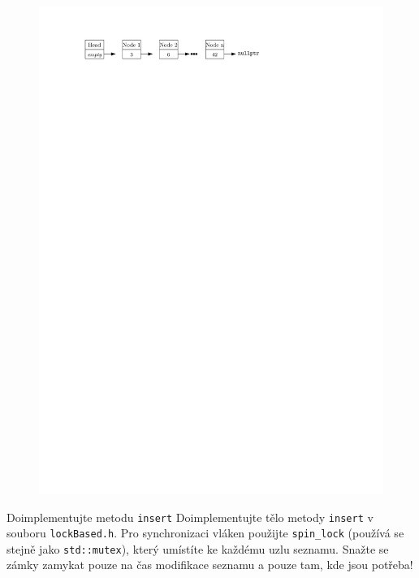 \documentclass[usenames,dvipsnames,9pt]{beamer}
\begin{document}
{\begin{frame}[fragile]
  \begin{figure}
    \centering\includegraphics{04/figs/linkedList.pdf}
  \end{figure}
  
    \pause

  \vspace{2em}
  
  \begin{block}{Doimplementujte metodu \texttt{insert}}
    Doimplementujte tělo metody \texttt{insert} v souboru \texttt{lockBased.h}.
    Pro synchronizaci vláken použijte \texttt{spin\_lock} (používá se stejně jako \texttt{std::mutex}), který umístíte ke každému uzlu seznamu.
    Snažte se zámky zamykat pouze na čas modifikace seznamu a pouze tam, kde jsou potřeba!
  \end{block}
\end{frame}
}
\end{document}
